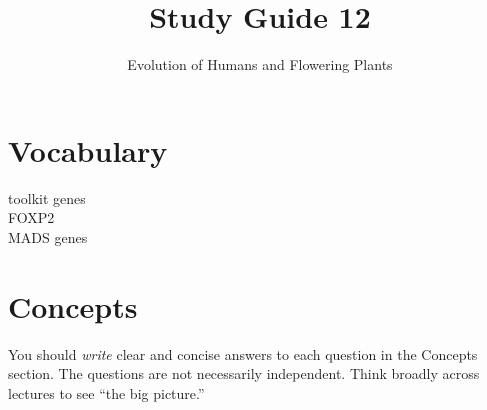 \documentclass[letterpaper]{tufte-handout}
\title{Study Guide 12\hfill}
\author{Evolution of Humans and Flowering Plants}
\date{} %
\begin{document}
\maketitle	%


\section{Vocabulary}
\vspace{-1\baselineskip}
\begin{multicols}{2}
toolkit genes\\
FOXP2\\
MADS genes\\
\end{multicols}

\section{Concepts}

You should \emph{write} clear and concise answers to each question in the Concepts section.  The questions are not necessarily independent.  Think broadly across lectures to see ``the big picture.'' 
\end{document}
